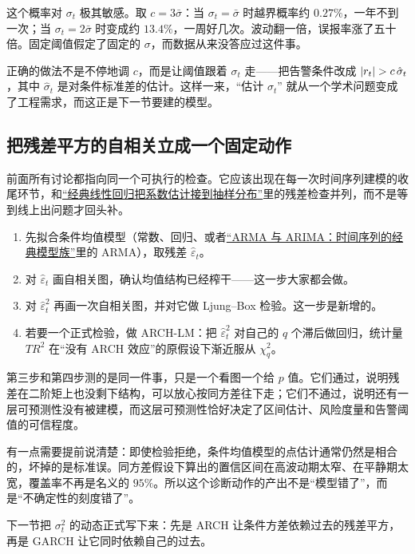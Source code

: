 这个概率对 \(\sigma_t\) 极其敏感。取 \(c=3\bar\sigma\)：当 \(\sigma_t=\bar\sigma\) 时越界概率约 \(0.27\%\)，一年不到一次；当 \(\sigma_t=2\bar\sigma\) 时变成约 \(13.4\%\)，一周好几次。波动翻一倍，误报率涨了五十倍。固定阈值假定了固定的 \(\sigma\)，而数据从来没答应过这件事。

正确的做法不是不停地调 \(c\)，而是让阈值跟着 \(\sigma_t\) 走——把告警条件改成 \(\abs{r_t}>c\,\hat\sigma_t\)，其中 \(\hat\sigma_t\) 是对条件标准差的估计。这样一来，``估计 \(\sigma_t\)'' 就从一个学术问题变成了工程需求，而这正是下一节要建的模型。

\subsection{把残差平方的自相关立成一个固定动作}

前面所有讨论都指向同一个可执行的检查。它应该出现在每一次时间序列建模的收尾环节，和\hyperref[sec:11-Mathematical-Statistics/08-Regression-and-ANOVA/01]{``经典线性回归把系数估计接到抽样分布''}里的残差检查并列，而不是等到线上出问题才回头补。

\begin{enumerate}
\tightlist
\item 先拟合条件均值模型（常数、回归、或者\hyperref[ch:052]{``ARMA 与 ARIMA：时间序列的经典模型族''}里的 ARMA），取残差 \(\hat\varepsilon_t\)。
\item 对 \(\hat\varepsilon_t\) 画自相关图，确认均值结构已经榨干——这一步大家都会做。
\item 对 \(\hat\varepsilon_t^2\) 再画一次自相关图，并对它做 Ljung--Box 检验。这一步是新增的。
\item 若要一个正式检验，做 ARCH-LM：把 \(\hat\varepsilon_t^2\) 对自己的 \(q\) 个滞后做回归，统计量 \(T R^2\) 在``没有 ARCH 效应''的原假设下渐近服从 \(\chi^2_q\)。
\end{enumerate}

第三步和第四步测的是同一件事，只是一个看图一个给 \(p\) 值。它们通过，说明残差在二阶矩上也没剩下结构，可以放心按同方差往下走；它们不通过，说明还有一层可预测性没有被建模，而这层可预测性恰好决定了区间估计、风险度量和告警阈值的可信程度。

有一点需要提前说清楚：即使检验拒绝，条件均值模型的点估计通常仍然是相合的，坏掉的是标准误。同方差假设下算出的置信区间在高波动期太窄、在平静期太宽，覆盖率不再是名义的 \(95\%\)。所以这个诊断动作的产出不是``模型错了''，而是``不确定性的刻度错了''。

下一节把 \(\sigma_t^2\) 的动态正式写下来：先是 ARCH 让条件方差依赖过去的残差平方，再是 GARCH 让它同时依赖自己的过去。
